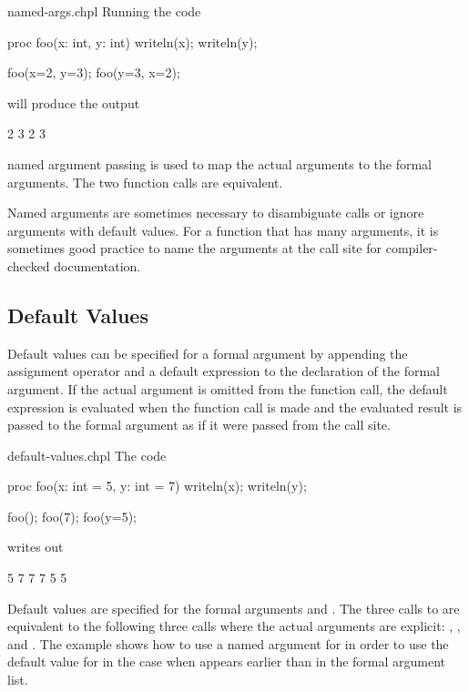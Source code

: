 \begin{chapelexample}{named-args.chpl}
Running the code
\begin{chapel}
proc foo(x: int, y: int) { writeln(x); writeln(y); }

foo(x=2, y=3);
foo(y=3, x=2);
\end{chapel}
will produce the output
\begin{chapelprintoutput}{}
2
3
2
3
\end{chapelprintoutput}
named argument passing is used to map the actual arguments to the
formal arguments.  The two function calls are equivalent.
\end{chapelexample}

Named arguments are sometimes necessary to disambiguate calls or
ignore arguments with default values.  For a function that has many
arguments, it is sometimes good practice to name the arguments at the
call site for compiler-checked documentation.

\subsection{Default Values}
\label{Default_Values}

Default values can be specified for a formal argument by appending the
assignment operator and a default expression to the declaration of the
formal argument.  If the actual argument is omitted from the function
call, the default expression is evaluated when the function call is
made and the evaluated result is passed to the formal argument as if
it were passed from the call site.

\begin{chapelexample}{default-values.chpl}
The code
\begin{chapel}
proc foo(x: int = 5, y: int = 7) { writeln(x); writeln(y); }

foo();
foo(7);
foo(y=5);
\end{chapel}
writes out
\begin{chapelprintoutput}{}
5
7
7
7
5
5
\end{chapelprintoutput}
Default values are specified for the formal arguments 
and .  The three calls to  are equivalent to the
following three calls where the actual arguments are
explicit: , , and .
The example  shows how to use a named argument
for  in order to use the default value for  in the
case when  appears earlier than  in the formal
argument list.
\end{chapelexample}


